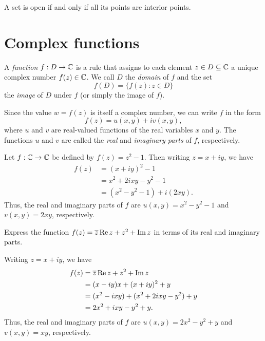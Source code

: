 \begin{theorem}
    A set is open if and only if all its points are interior points.
    \label{thm:open-interior}
\end{theorem}

\section{Complex functions}

\begin{definition}
    A \emph{function} \(f : D \to \mathbb{C}\) is a rule that assigns to each element \(z \in D \subseteq \mathbb{C}\) a unique complex number \(f(z) \in \mathbb{C}\). We call \(D\) the \emph{domain} of \(f\) and the set
    \[
        f(D) = \{f(z) : z \in D\}
    \]
    the \emph{image} of \(D\) under \(f\) (or simply the image of \(f\)).
    \label{def:complex-function}
\end{definition}

Since the value \(w = f(z)\) is itself a complex number, we can write \(f\) in the form
\[
    f(z) = u(x, y) + iv(x, y),
\]
where \(u\) and \(v\) are real-valued functions of the real variables \(x\) and \(y\). The functions \(u\) and \(v\) are called the \emph{real} and \emph{imaginary parts} of \(f\), respectively.

\begin{example}
    Let \(f : \mathbb{C} \to \mathbb{C}\) be defined by \(f(z) = z^2 - 1\). Then writing \(z = x + iy\), we have
    \[
        \begin{aligned}
            f(z) &= (x + iy)^2 - 1 \\
            &= x^2 + 2ixy - y^2 - 1 \\
            &= (x^2 - y^2 - 1) + i(2xy).
        \end{aligned}
    \]
    Thus, the real and imaginary parts of \(f\) are \(u(x, y) = x^2 - y^2 - 1\) and \(v(x, y) = 2xy\), respectively.
\end{example}

\begin{example}
    Express the function \(f(z) = \overline{z}\operatorname{Re} z + z^2 + \operatorname{Im} z\) in terms of its real and imaginary parts.

    \begin{solution}
        Writing \(z = x + iy\), we have
        \[
            \begin{aligned}
                f(z) &= \overline{z}\operatorname{Re} z + z^2 + \operatorname{Im} z \\
                &= (x - iy)x + (x + iy)^2 + y \\
                &= (x^2 - ixy) + (x^2 + 2ixy - y^2) + y \\
                &= 2x^2 + ixy - y^2 + y.
            \end{aligned}
        \]
        Thus, the real and imaginary parts of \(f\) are \(u(x, y) = 2x^2 - y^2 + y\) and \(v(x, y) = xy\), respectively.
    \end{solution}
\end{example}

